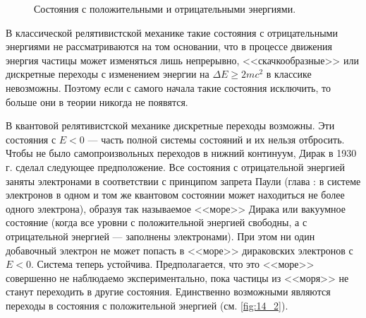 \begin{figure}[h!]
\centering
{}
\caption{Состояния с положительными и отрицательными энергиями.} \label{fig:14_1}
\end{figure}

В классической релятивистской механике такие состояния с отрицательными энергиями не рассматриваются на том основании, что в процессе движения энергия частицы может изменяться лишь непрерывно, <<скачкообразные>> или дискретные переходы с изменением энергии на $\Delta E \ge 2mc^2$ в классике невозможны. Поэтому если с самого начала такие состояния исключить, то больше они в теории никогда не появятся.

В квантовой релятивистской механике дискретные переходы возможны. Эти состояния с $E< 0$ --- часть полной системы состояний и их нельзя отбросить. Чтобы не было самопроизвольных переходов в нижний континуум, Дирак в 1930 г. сделал следующее предположение. Все состояния с отрицательной энергией заняты электронами в соответствии с принципом запрета Паули (глава : в системе электронов в одном и том же квантовом состоянии может находиться не более одного электрона), образуя так называемое <<море>> Дирака или вакуумное состояние (когда все уровни с положительной энергией свободны, а с отрицательной энергией --- заполнены электронами). При этом ни один добавочный электрон не может попасть в <<море>> дираковских электронов с $E<0$. Система теперь устойчива. Предполагается, что это <<море>> совершенно не наблюдаемо экспериментально, пока частицы из <<моря>> не станут переходить в другие состояния. Единственно возможными являются переходы в состояния с положительной энергией (см. \autoref{fig:14_2}).


